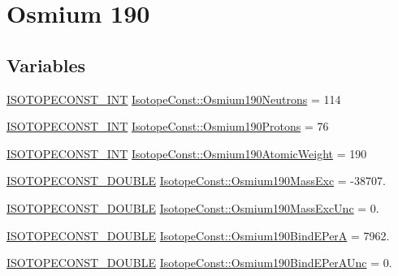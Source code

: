 \hypertarget{group___isotope_const-_osmium-_os190}{}\section{Osmium 190}
\label{group___isotope_const-_osmium-_os190}
\subsection*{Variables}
\begin{DoxyCompactItemize}
\item 
\mbox{\hyperlink{group___isotope_const-_macros_ga5f18360b3e99483a35c32d789e62621c}{I\+S\+O\+T\+O\+P\+E\+C\+O\+N\+S\+T\+\_\+\+I\+NT}} \mbox{\hyperlink{group___isotope_const-_osmium-_os190_ga5c15afc1a5f4ca18f7dbd282fd856284}{Isotope\+Const\+::\+Osmium190\+Neutrons}} = 114
\item 
\mbox{\hyperlink{group___isotope_const-_macros_ga5f18360b3e99483a35c32d789e62621c}{I\+S\+O\+T\+O\+P\+E\+C\+O\+N\+S\+T\+\_\+\+I\+NT}} \mbox{\hyperlink{group___isotope_const-_osmium-_os190_ga1612cab63b7857fdf68f95f7c2741cf2}{Isotope\+Const\+::\+Osmium190\+Protons}} = 76
\item 
\mbox{\hyperlink{group___isotope_const-_macros_ga5f18360b3e99483a35c32d789e62621c}{I\+S\+O\+T\+O\+P\+E\+C\+O\+N\+S\+T\+\_\+\+I\+NT}} \mbox{\hyperlink{group___isotope_const-_osmium-_os190_gab2082f354cb80babbae939e8fd2b0070}{Isotope\+Const\+::\+Osmium190\+Atomic\+Weight}} = 190
\item 
\mbox{\hyperlink{group___isotope_const-_macros_ga8f45a7272ce02c0b4c65c44636ed719a}{I\+S\+O\+T\+O\+P\+E\+C\+O\+N\+S\+T\+\_\+\+D\+O\+U\+B\+LE}} \mbox{\hyperlink{group___isotope_const-_osmium-_os190_gae9d1377aab7f14630fd712a83047f707}{Isotope\+Const\+::\+Osmium190\+Mass\+Exc}} = -\/38707.
\item 
\mbox{\hyperlink{group___isotope_const-_macros_ga8f45a7272ce02c0b4c65c44636ed719a}{I\+S\+O\+T\+O\+P\+E\+C\+O\+N\+S\+T\+\_\+\+D\+O\+U\+B\+LE}} \mbox{\hyperlink{group___isotope_const-_osmium-_os190_gad12e612a159b81adb4d4755afdc35309}{Isotope\+Const\+::\+Osmium190\+Mass\+Exc\+Unc}} = 0.
\item 
\mbox{\hyperlink{group___isotope_const-_macros_ga8f45a7272ce02c0b4c65c44636ed719a}{I\+S\+O\+T\+O\+P\+E\+C\+O\+N\+S\+T\+\_\+\+D\+O\+U\+B\+LE}} \mbox{\hyperlink{group___isotope_const-_osmium-_os190_gafe05480f17b3183e9dd2aabd1d20bbc9}{Isotope\+Const\+::\+Osmium190\+Bind\+E\+PerA}} = 7962.
\item 
\mbox{\hyperlink{group___isotope_const-_macros_ga8f45a7272ce02c0b4c65c44636ed719a}{I\+S\+O\+T\+O\+P\+E\+C\+O\+N\+S\+T\+\_\+\+D\+O\+U\+B\+LE}} \mbox{\hyperlink{group___isotope_const-_osmium-_os190_gac5265ce364612d06db96098ddb02d55e}{Isotope\+Const\+::\+Osmium190\+Bind\+E\+Per\+A\+Unc}} = 0.

\end{DoxyCompactItemize}

